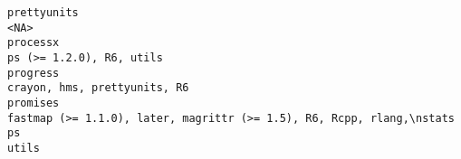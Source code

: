 \documentclass[
  letterpaper,
  DIV=11,
  numbers=noendperiod]{scrreprt}
\begin{document}
\begin{verbatim}
prettyunits                                                                                                                                                                                                                                                                                                                                                                                                                                                                                                                                                                                                           <NA>
processx                                                                                                                                                                                                                                                                                                                                                                                                                                                                                                                                                                                          ps (>= 1.2.0), R6, utils
progress                                                                                                                                                                                                                                                                                                                                                                                                                                                                                                                                                                                      crayon, hms, prettyunits, R6
promises                                                                                                                                                                                                                                                                                                                                                                                                                                                                                                                                             fastmap (>= 1.1.0), later, magrittr (>= 1.5), R6, Rcpp, rlang,\nstats
ps                                                                                                                                                                                                                                                                                                                                                                                                                                                                                                                                                                                                                   utils

\end{verbatim}
\end{document}
